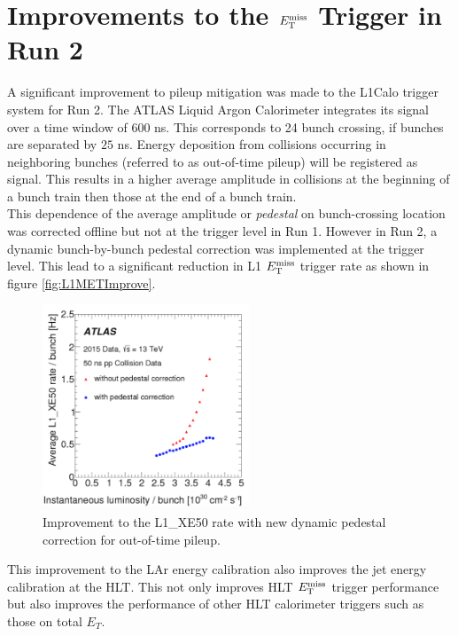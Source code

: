 \section{Improvements to the $E_{\mathrm{T}}^{\mathrm{miss}}$ Trigger in Run 2}
\label{sec:trig:improvements}

\indent A significant improvement to pileup mitigation was made to the L1Calo trigger system for Run 2.\cite{Trigger2015}  The ATLAS Liquid Argon Calorimeter integrates its signal over a time window of $600$ ns.  This corresponds to 24 bunch crossing, if bunches are separated by $25$ ns.  Energy deposition from collisions occurring in neighboring bunches (referred to as out-of-time pileup) will be registered as signal.  This results in a higher average amplitude in collisions at the beginning of a bunch train then those at the end of a bunch train.  \\

\indent This dependence of the average amplitude or {\it pedestal} on bunch-crossing location was corrected offline but not at the trigger level in Run 1.  However in Run 2, a dynamic bunch-by-bunch pedestal correction was implemented at the trigger level.  This lead to a significant reduction in L1 $E_{\mathrm{T}}^{\mathrm{miss}}$ trigger rate as shown in figure \ref{fig:L1METImprove}. \\

\begin{figure}[htb]
  \begin{center}
    \includegraphics[width=0.55\textwidth]{figures/trigger/L1_XE50.png}\hspace{0.05\textwidth}
\end{center}
\caption{Improvement to the L1\_XE50 rate with new dynamic pedestal correction for out-of-time pileup.\cite{Trigger2015}}
\label{fig:trigScheme} 
\end{figure}

\indent This improvement to the LAr energy calibration also improves the jet energy calibration at the HLT.  This not only improves HLT $E_{\mathrm{T}}^{\mathrm{miss}}$ trigger performance but also improves the performance of other HLT calorimeter triggers such as those on total $E_T$. \cite{Trigger2016} \\